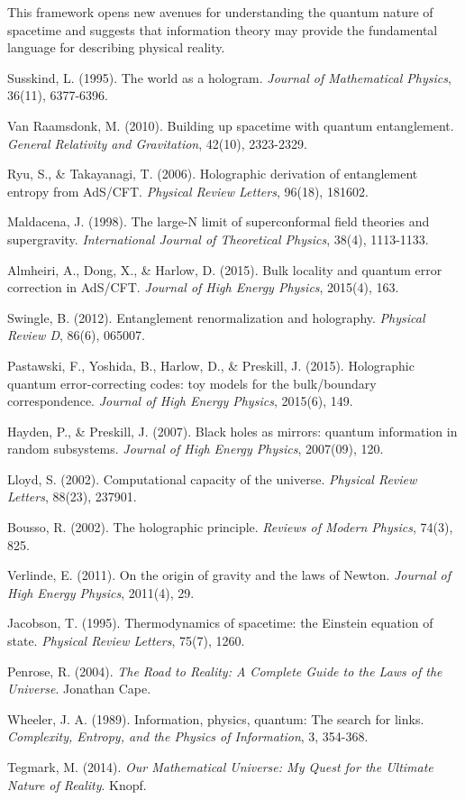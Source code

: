 \documentclass[12pt]{article}
\begin{document}
This framework opens new avenues for understanding the quantum nature of spacetime and suggests that information theory may provide the fundamental language for describing physical reality.

\begin{thebibliography}{99}

 Susskind, L. (1995). The world as a hologram. \emph{Journal of Mathematical Physics}, 36(11), 6377-6396.

 Van Raamsdonk, M. (2010). Building up spacetime with quantum entanglement. \emph{General Relativity and Gravitation}, 42(10), 2323-2329.

 Ryu, S., \& Takayanagi, T. (2006). Holographic derivation of entanglement entropy from AdS/CFT. \emph{Physical Review Letters}, 96(18), 181602.

 Maldacena, J. (1998). The large-N limit of superconformal field theories and supergravity. \emph{International Journal of Theoretical Physics}, 38(4), 1113-1133.

 Almheiri, A., Dong, X., \& Harlow, D. (2015). Bulk locality and quantum error correction in AdS/CFT. \emph{Journal of High Energy Physics}, 2015(4), 163.

 Swingle, B. (2012). Entanglement renormalization and holography. \emph{Physical Review D}, 86(6), 065007.

 Pastawski, F., Yoshida, B., Harlow, D., \& Preskill, J. (2015). Holographic quantum error-correcting codes: toy models for the bulk/boundary correspondence. \emph{Journal of High Energy Physics}, 2015(6), 149.

 Hayden, P., \& Preskill, J. (2007). Black holes as mirrors: quantum information in random subsystems. \emph{Journal of High Energy Physics}, 2007(09), 120.

 Lloyd, S. (2002). Computational capacity of the universe. \emph{Physical Review Letters}, 88(23), 237901.

 Bousso, R. (2002). The holographic principle. \emph{Reviews of Modern Physics}, 74(3), 825.

 Verlinde, E. (2011). On the origin of gravity and the laws of Newton. \emph{Journal of High Energy Physics}, 2011(4), 29.

 Jacobson, T. (1995). Thermodynamics of spacetime: the Einstein equation of state. \emph{Physical Review Letters}, 75(7), 1260.

 Penrose, R. (2004). \emph{The Road to Reality: A Complete Guide to the Laws of the Universe}. Jonathan Cape.

 Wheeler, J. A. (1989). Information, physics, quantum: The search for links. \emph{Complexity, Entropy, and the Physics of Information}, 3, 354-368.

 Tegmark, M. (2014). \emph{Our Mathematical Universe: My Quest for the Ultimate Nature of Reality}. Knopf.

\end{thebibliography}
\end{document}
